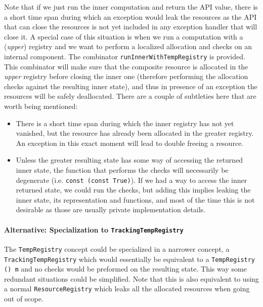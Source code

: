 Note that if we just run the inner computation and return the API value, there
is a short time span during which an exception would leak the resources as the
API that can close the resources is not yet included in any exception handler
that will close it. A special case of this situation is when we run a
computation with a (\emph{upper}) registry and we want to perform a localized
allocation and checks on an internal component. The combinator
\lstinline!runInnerWithTempRegistry! is provided. This combinator will make sure
that the composite resource is allocated in the \emph{upper} registry before
closing the inner one (therefore performing the allocation checks against the
resulting inner state), and thus in presence of an exception the resources will
be safely deallocated. There are a couple of subtleties here that are worth
being mentioned:

\begin{itemize}
  \item There is a short time span during which the inner registry has not yet
        vanished, but the resource has already been allocated in the greater
        registry. An exception in this exact moment will lead to double freeing
        a resource.
  \item Unless the greater resulting state has some way of accessing the
        returned inner state, the function that performs the checks will
        necessarily be degenerate (i.e. \lstinline!const (const True)!). If we
        had a way to access the inner returned state, we could run the checks,
        but adding this implies leaking the inner state, its representation and
        functions, and most of the time this is not desirable as those are
        usually private implementation details.
\end{itemize}

\paragraph{Alternative: Specialization to \lstinline!TrackingTempRegistry!} The
\lstinline!TempRegistry! concept could be specialized in a narrower concept, a
\lstinline!TrackingTempRegistry! which would essentially be equivalent to a
\lstinline!TempRegistry () m! and no checks would be preformed on the resulting
state. This way some redundant situations could be simplified. Note that this is
also equivalent to using a normal \lstinline!ResourceRegistry! which leaks all
the allocated resources when going out of scope.
